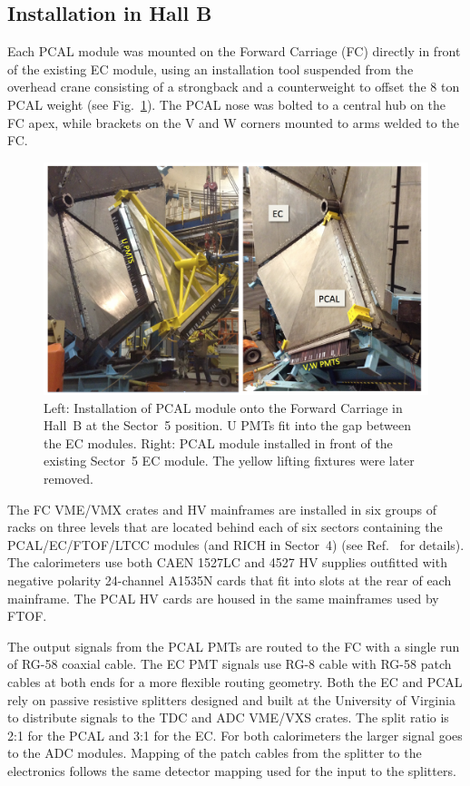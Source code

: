 \subsection{Installation in Hall B}

Each PCAL module was mounted on the Forward Carriage (FC) directly in front of the existing EC module, using
an installation tool suspended from the overhead crane consisting of a strongback and a counterweight to offset
the 8 ton PCAL weight (see Fig.~\ref{fig:S5_1}). The PCAL nose was bolted to a central hub on the FC apex, while
brackets on the V and W corners mounted to arms welded to the FC.   

\begin{figure}[hbt]
\centering
\includegraphics[width=0.95\columnwidth,keepaspectratio]{img/S5_1.png}
\caption{Left: Installation of PCAL module onto the Forward Carriage in Hall~B at the Sector~5 position. U PMTs
  fit into the gap between the EC modules. Right: PCAL module installed in front of the existing Sector~5 EC
  module. The yellow lifting fixtures were later removed.}
\label{fig:S5_1}
\end{figure}

The FC VME/VMX crates and HV mainframes are installed in six groups of racks on three levels that are located
behind each of six sectors containing the PCAL/EC/FTOF/LTCC modules (and RICH in Sector~4) (see
Ref.~\cite{nim:overview} for details). The calorimeters use both CAEN 1527LC and 4527 HV supplies outfitted
with negative polarity 24-channel A1535N cards that fit into slots at the rear of each mainframe. The PCAL HV
cards are housed in the same mainframes used by FTOF.  

The output signals from the PCAL PMTs are routed to the FC with a single run of RG-58 coaxial cable. The EC PMT
signals use RG-8 cable with RG-58 patch cables at both ends for a more flexible routing geometry. Both the EC and
PCAL rely on passive resistive splitters designed and built at the University of Virginia to distribute signals to the
TDC and ADC VME/VXS crates. The split ratio is 2:1 for the PCAL and 3:1 for the EC. For both calorimeters the
larger signal goes to the ADC modules. Mapping of the patch cables from the splitter to the electronics follows the
same detector mapping used for the input to the splitters.

